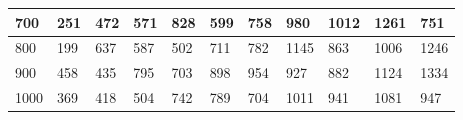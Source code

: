 \documentclass[10pt,letterpaper]{article}
\begin{document}
\begin{center}
\begin{table}
\begin{tabular} { |m{0.5cm}|m{1.3cm}|m{1.3cm}|m{1.3cm}|m{1.3cm}|m{1.3cm}|m{1.3cm}|m{1.3cm}|m{1.3cm}|m{1.3cm}|m{1.3cm}|}
\hline
\cellcolor{Gray}700 & \Large 251 & \Large 472 & \Large 571 & \Large 828 & \Large 599 & \Large 758 & \Large 980 & \Large 1012 & \Large 1261 & \Large 751 \\
\hline
\cellcolor{Gray}800 & \Large 199 & \Large 637 & \Large 587 & \Large 502 & \Large 711 & \Large 782 & \Large 1145 & \Large 863 & \Large 1006 & \Large 1246 \\
\hline
\cellcolor{Gray}900 & \Large 458 & \Large 435 & \Large 795 & \Large 703 & \Large 898 & \Large 954 & \Large 927 & \Large 882 & \Large 1124 & \Large 1334 \\
\hline
\cellcolor{Gray}1000 & \Large 369 & \Large 418 & \Large 504 & \Large 742 & \Large 789 & \Large 704 & \Large 1011 & \Large 941 & \Large 1081 & \Large 947 \\
\hline
\end{tabular} \\
\end{table}
\end{center}
\newpage 
{}
\end{document}
